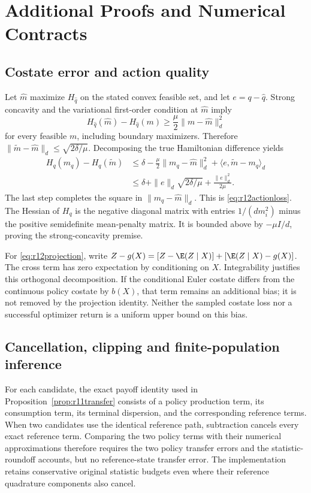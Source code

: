 \section{Additional Proofs and Numerical Contracts}\label{app:r12proofs}
\subsection{Costate error and action quality}
Let $\widehat m$ maximize $H_{\widehat q}$ on the stated convex feasible set, and let $e=q-\widehat q$. Strong concavity and the variational first-order condition at $\widehat m$ imply
\[
 H_{\widehat q}(\widehat m)-H_{\widehat q}(m)
       \geq \frac\mu2\|m-\widehat m\|_d^2
\]
for every feasible $m$, including boundary maximizers. Therefore
$\|\widetilde m-\widehat m\|_d\leq\sqrt{2\delta/\mu}$. Decomposing the true Hamiltonian difference yields
\begin{align*}
 H_q(m_q)-H_q(\widetilde m)
 &\leq \delta-\frac\mu2\|m_q-\widehat m\|_d^2
           +\langle e,\widetilde m-m_q\rangle_d\\
 &\leq \delta+\|e\|_d\sqrt{2\delta/\mu}+\frac{\|e\|_d^2}{2\mu}.
\end{align*}
The last step completes the square in $\|m_q-\widehat m\|_d$. This is \eqref{eq:r12actionloss}. The Hessian of $H_q$ is the negative diagonal matrix with entries $1/(dm_i^2)$ minus the positive semidefinite mean-penalty matrix. It is bounded above by $-\mu I/d$, proving the strong-concavity premise.

For \eqref{eq:r12projection}, write $Z-g(X)=[Z-\E(Z\mid X)]+[\E(Z\mid X)-g(X)]$. The cross term has zero expectation by conditioning on $X$. Integrability justifies this orthogonal decomposition. If the conditional Euler costate differs from the continuous policy costate by $b(X)$, that term remains an additional bias; it is not removed by the projection identity. Neither the sampled costate loss nor a successful optimizer return is a uniform upper bound on this bias.

\subsection{Cancellation, clipping and finite-population inference}
For each candidate, the exact payoff identity used in Proposition~\ref{prop:r11transfer} consists of a policy production term, its consumption term, its terminal dispersion, and the corresponding reference terms. When two candidates use the identical reference path, subtraction cancels every exact reference term. Comparing the two policy terms with their numerical approximations therefore requires the two policy transfer errors and the statistic-roundoff accounts, but no reference-state transfer error. The implementation retains conservative original statistic budgets even where their reference quadrature components also cancel.

